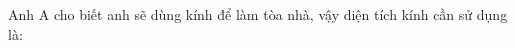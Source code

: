 \documentclass[preview]{standalone}
\begin{document}
\begin{center}
Anh A cho biết anh sẽ dùng kính để làm tòa nhà, vậy diện tích kính cần sử dụng là:
\end{center}
\end{document}
